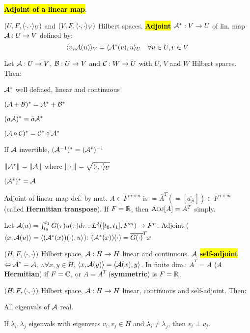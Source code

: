\textbf{\hl{Adjoint of a linear map}}.
\begin{Definition}
$(U,F,\langle\cdot,\cdot\rangle_U)$ and $(V,F,\langle\cdot,\cdot\rangle_V)$ Hilbert spaces. \textbf{\hl{Adjoint}} $\mathcal{A}^*:V\to U$ of lin. map $\mathcal{A}:U\to V$ defined by:
\begin{equation*}
\langle v,\mathcal{A}(u)\rangle_V=\langle\mathcal{A}^*(v),u\rangle_U\quad\forall u\in U, v\in V
\end{equation*}
\end{Definition}
\begin{Theorem}
Let $\mathcal{A}:U\to V$, $\mathcal{B}:U\to V$ and $\mathcal{C}:W\to U$ with $U$, $V$ and $W$ Hilbert spaces. Then: \begin{itemize*}
  \item $\mathcal{A}^*$ well defined, linear and continuous
  \item $(\mathcal{A}+\mathcal{B})^*=\mathcal{A}^*+\mathcal{B}^*$
  \item $(a\mathcal{A})^*=\bar a\mathcal{A}^*$
  \item $(\mathcal{A}\circ\mathcal{C})^*=\mathcal{C}^*\circ\mathcal{A}^*$
  \item If $\mathcal{A}$ invertible, $(\mathcal{A}^{-1})^*=(\mathcal{A}^*)^{-1}$
  \item $\|\mathcal{A}^*\|_{}=\|\mathcal{A}\|_{}$ where $\|\cdot\|_{}=\sqrt{\langle\cdot,\cdot\rangle_U}$
  \item $(\mathcal{A}^*)^*=\mathcal{A}$
\end{itemize*}
\end{Theorem}
\begin{Example}
Adjoint of linear map def. by mat. $A\in F^{m\times n}$ is $=\overline{A}^T(=[\overline{a_{ji}}])\in F^{n\times m}$ (called \textbf{Hermitian transpose}). If $F=\mathbb R$, then $\textsc{Adj}[A]=A^T$ simply.
\end{Example}
\begin{Example}
Let $\mathcal{A}(u)=\int_{t_0}^{t_1}G(\tau)u(\tau)d\tau:L^2([t_0,t_1],F^m)\to F^n$. Adjoint ($\langle x,\mathcal{A}(u)\rangle=\langle(\mathcal{A}^*(x))(\cdot),u\rangle$): $(\mathcal{A}^*(x))(\cdot)=\overline{G(\cdot)}^Tx$
\end{Example}
\begin{Definition}
$(H,F,\langle\cdot,\cdot\rangle)$ Hilbert space, $\mathcal{A}:H\to H$ linear and continuous. $\mathcal{A}$ \textbf{\hl{self-adjoint}}$\Leftrightarrow\mathcal{A}^*=\mathcal{A}$, $\therefore\forall x,y\in H$, $\langle x,\mathcal{A}(y)\rangle=\langle\mathcal{A}(x),y\rangle$. In finite dim.: $\overline{A}^T=A$ ($A$ \textbf{Hermitian}) if $F=\mathbb C$, or $A=A^T$ (\textbf{symmetric}) is $F=\mathbb R$.
\end{Definition}
\begin{Theorem}
$(H,F,\langle\cdot,\cdot\rangle)$ Hilbert space, $\mathcal{A}:H\to H$ linear, continuous and self-adjoint. Then: \begin{enumerate*}
  \item All eigenvals of $\mathcal{A}$ real.
  \item If $\lambda_i,\lambda_j$ eigenvals with eigenvecs $v_i,v_j\in H$ and $\lambda_i\ne\lambda_j$, then $v_i\perp v_j$.
\end{enumerate*}
\end{Theorem}
